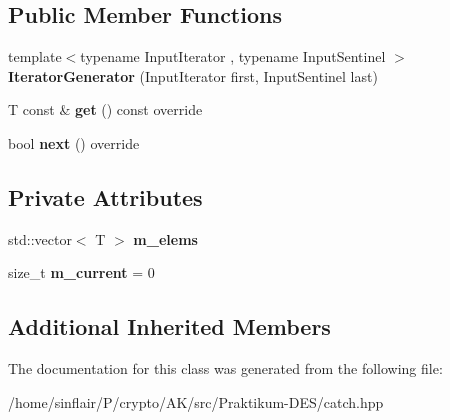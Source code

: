 \subsection*{Public Member Functions}
\begin{DoxyCompactItemize}
\item 
\mbox{\label{classCatch_1_1Generators_1_1IteratorGenerator_a1f795b1bbd515274673115c0a9fc2e54}} 
{\footnotesize template$<$typename Input\+Iterator , typename Input\+Sentinel $>$ }\\{\bfseries Iterator\+Generator} (Input\+Iterator first, Input\+Sentinel last)
\item 
\mbox{\label{classCatch_1_1Generators_1_1IteratorGenerator_a61688118e5caba23340b4b949c3bb7e4}} 
T const  \& {\bfseries get} () const override
\item 
\mbox{\label{classCatch_1_1Generators_1_1IteratorGenerator_acafb4fa1eebe5e1db571621a35a3f137}} 
bool {\bfseries next} () override
\end{DoxyCompactItemize}
\subsection*{Private Attributes}
\begin{DoxyCompactItemize}
\item 
\mbox{\label{classCatch_1_1Generators_1_1IteratorGenerator_a74eb1a6990cf0e3b548e8654bd6e99ef}} 
std\+::vector$<$ T $>$ {\bfseries m\+\_\+elems}
\item 
\mbox{\label{classCatch_1_1Generators_1_1IteratorGenerator_a43b70e3cf312294219bd2485eaa75ba1}} 
size\+\_\+t {\bfseries m\+\_\+current} = 0
\end{DoxyCompactItemize}
\subsection*{Additional Inherited Members}


The documentation for this class was generated from the following file\+:\begin{DoxyCompactItemize}
\item 
/home/sinflair/\+P/crypto/\+A\+K/src/\+Praktikum-\/\+D\+E\+S/catch.\+hpp\end{DoxyCompactItemize}
